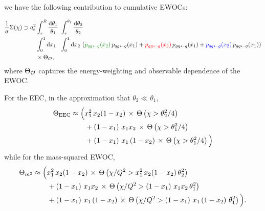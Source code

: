 we have the following contribution to cumulative EWOCs:

\begin{subequations}
\begin{align}
    \frac{1}{\sigma}\Sigma(\chi)
    \supset
    \as^2
    &
    \int_r^R \frac{\dd\theta_1}{\theta_1}
    \,\,
    \int_r^{\theta_1} \frac{\dd\theta_2}{\theta_2}
    \\
    &\int_0^1 \dd x_1 \,\,
    \,\,
    \int_0^1 \dd x_2 \, \le(
        \textcolor{green!50!black}{
        p_{qg\leftarrow q}(x_2)
        }
        \,
        p_{qg\leftarrow q}(x_1)
        +
        \textcolor{red}{
        p_{gg\leftarrow g}(x_2)
        }
        \,
        p_{gq\leftarrow q}(x_1)
        +
        \textcolor{blue}{
        p_{qq\leftarrow g}(x_2)
        }
        \,
        p_{gq\leftarrow q}(x_1)
    \ri)
    \\
    &\times
    \Theta_{\mc O}
    ,
\end{align}
\end{subequations}
where \(\Theta_{\mathcal{O}}\) captures the energy-weighting and observable dependence of the EWOC.

For the EEC, in the approximation that \(\theta_2 \ll \theta_1\),
\begin{align}
    \Theta_{\rm EEC}
    &\approx
    \Big(
        x_1^2\,x_2(1-x_2)
        \,\times\,
        \Theta\left(
            \chi
            >
            \theta_2^2/4
        \right)
        \\
        &\qquad\notag
        +
        \left(1-x_1\right)\,x_1 x_2
        \,\times\,
        \Theta\left(
            \chi
            >
            \theta_1^2/4
        \right)
        \\
        &\qquad\notag
        \textbf{}+
        \left(1-x_1\right)\,x_1\left(1-x_2\right)
        \,\times\,
        \Theta\left(
            \chi
            >
            \theta_1^2/4
        \right)
    \Big)
\end{align}
while for the mass-squared EWOC,
\begin{align}
    \Theta_{m^2}
    &\approx
    \Big(
        x_1^2\,x_2(1-x_2)
        \,\times\,
        \Theta\left(
            \chi/Q^2
            >
            x_1^2\,x_2(1-x_2)
            \,
            \theta_2^2
        \right)
        \\
        &\qquad\notag
        +
        \left(1-x_1\right)\,x_1 x_2
        \,\times\,
        \Theta\left(
            \chi/Q^2
            >
            \left(1-x_1\right)\,x_1 x_2
            \,
            \theta_1^2
        \right)
        \\
        &\qquad\notag
        +
        \left(1-x_1\right)\,x_1\left(1-x_2\right)
        \,\times\,
        \Theta\left(
            \chi/Q^2
            >
            \left(1-x_1\right)\,x_1\left(1-x_2\right)
            \,
            \theta_1^2
        \right)
    \Big)
    .
\end{align}

